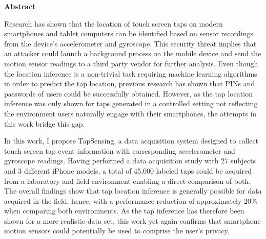 \thispagestyle{empty}
\vspace*{1.2cm}

\begin{center}
    \textbf{Abstract}
\end{center}

\vspace*{0.5cm}

\noindent

Research has shown that the location of touch screen taps on modern smartphones and tablet computers can be identified based on sensor recordings from the device's accelerometer and gyroscope. This security threat implies that an attacker could launch a background process on the mobile device and send the motion sensor readings to a third party vendor for further analysis. Even though the location inference is a non-trivial task requiring machine learning algorithms in order to predict the tap location, previous research has shown that PINs and passwords of users could be successfully obtained. However, as the tap location inference was only shown for taps generated in a controlled setting not reflecting the environment users naturally engage with their smartphones, the attempts in this work bridge this gap.

In this work, I propose TapSensing, a data acquisition system designed to collect touch screen tap event information with corresponding accelerometer and gyroscope readings. Having performed a data acquisition study with 27 subjects and 3 different iPhone models, a total of 45,000 labeled taps could be acquired from a laboratory and field environment enabling a direct comparison of both. The overall findings show that tap location inference is generally possible for data acquired in the field, hence, with a performance reduction of approximately 20\% when comparing both environments. As the tap inference has therefore been shown for a more realistic data set, this work yet again confirms that smartphone motion sensors could potentially be used to comprise the user's privacy.